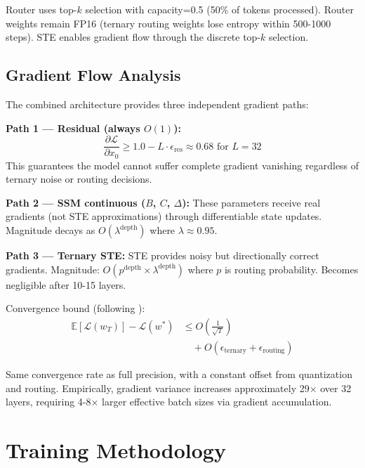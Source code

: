 \documentclass{article}
\begin{document}
Router uses top-$k$ selection with capacity=0.5 (50\% of tokens processed). Router weights remain FP16 (ternary routing weights lose entropy within 500-1000 steps). STE enables gradient flow through the discrete top-$k$ selection.

\subsection{Gradient Flow Analysis}

The combined architecture provides three independent gradient paths:

\textbf{Path 1 --- Residual (always $O(1)$):}
\begin{equation}
\frac{\partial \mathcal{L}}{\partial x_0} \geq 1.0 - L \cdot \epsilon_\text{res} \approx 0.68 \text{ for } L=32
\end{equation}
This guarantees the model cannot suffer complete gradient vanishing regardless of ternary noise or routing decisions.

\textbf{Path 2 --- SSM continuous ($B$, $C$, $\Delta$):}
These parameters receive real gradients (not STE approximations) through differentiable state updates. Magnitude decays as $O(\lambda^\text{depth})$ where $\lambda \approx 0.95$.

\textbf{Path 3 --- Ternary STE:}
STE provides noisy but directionally correct gradients. Magnitude: $O(p^\text{depth} \times \lambda^\text{depth})$ where $p$ is routing probability. Becomes negligible after 10-15 layers.

Convergence bound (following \citet{yin2019understanding}):
\begin{equation}
\begin{split}
\mathbb{E}[\mathcal{L}(w_T)] - \mathcal{L}(w^*) &\leq O\left(\frac{1}{\sqrt{T}}\right) \\
&\quad + O(\epsilon_\text{ternary} + \epsilon_\text{routing})
\end{split}
\end{equation}

Same convergence rate as full precision, with a constant offset from quantization and routing. Empirically, gradient variance increases approximately 29$\times$ over 32 layers, requiring 4-8$\times$ larger effective batch sizes via gradient accumulation.

\section{Training Methodology}
\end{document}
